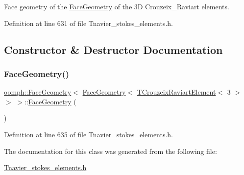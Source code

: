 Face geometry of the \hyperlink{classoomph_1_1FaceGeometry}{Face\+Geometry} of the 3D Crouzeix\+\_\+\+Raviart elements. 

Definition at line 631 of file Tnavier\+\_\+stokes\+\_\+elements.\+h.



\subsection{Constructor \& Destructor Documentation}
\mbox{\label{classoomph_1_1FaceGeometry_3_01FaceGeometry_3_01TCrouzeixRaviartElement_3_013_01_4_01_4_01_4_ab5ba08f641cf8cd579abc2a533545c19}} 
\subsubsection{\texorpdfstring{Face\+Geometry()}{FaceGeometry()}}
{\footnotesize\ttfamily \hyperlink{classoomph_1_1FaceGeometry}{oomph\+::\+Face\+Geometry}$<$ \hyperlink{classoomph_1_1FaceGeometry}{Face\+Geometry}$<$ \hyperlink{classoomph_1_1TCrouzeixRaviartElement}{T\+Crouzeix\+Raviart\+Element}$<$ 3 $>$ $>$ $>$\+::\hyperlink{classoomph_1_1FaceGeometry}{Face\+Geometry} (\begin{DoxyParamCaption}{ }\end{DoxyParamCaption})\hspace{0.3cm}{\ttfamily [inline]}}



Definition at line 635 of file Tnavier\+\_\+stokes\+\_\+elements.\+h.



The documentation for this class was generated from the following file\+:\begin{DoxyCompactItemize}
\item 
\hyperlink{Tnavier__stokes__elements_8h}{Tnavier\+\_\+stokes\+\_\+elements.\+h}\end{DoxyCompactItemize}
